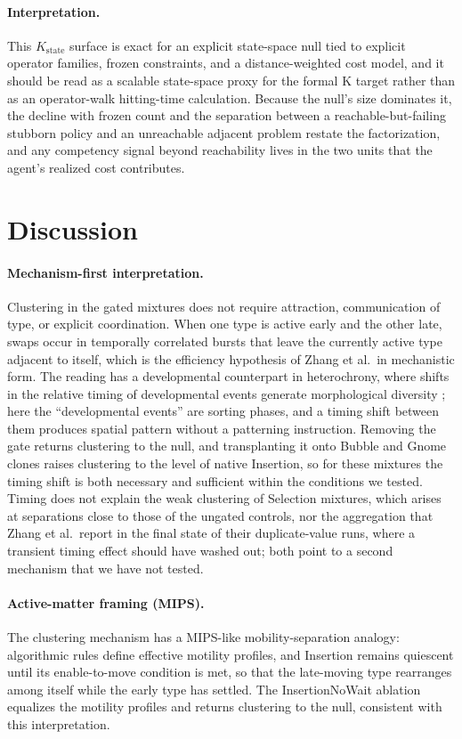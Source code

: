 \documentclass[11pt]{article}
\begin{document}
\paragraph{Interpretation.}
This $K_{\mathrm{state}}$ surface is exact for an explicit state-space null tied to explicit
operator families, frozen constraints, and a distance-weighted cost model, and it should be read as
a scalable state-space proxy for the formal K target rather than as an operator-walk hitting-time
calculation. Because the null's size dominates it, the decline with frozen count and the
separation between a reachable-but-failing stubborn policy and an unreachable adjacent problem
restate the factorization, and any competency signal beyond reachability lives in the two units
that the agent's realized cost contributes.

\section{Discussion}
\label{sec:discussion}
\paragraph{Mechanism-first interpretation.}
Clustering in the gated mixtures does not require attraction, communication of type, or explicit
coordination. When one type is active early and the other late, swaps occur in temporally
correlated bursts that leave the currently active type adjacent to itself, which is the efficiency
hypothesis of Zhang et al.\ in mechanistic form. The reading has a developmental counterpart in
heterochrony, where shifts in the relative timing of developmental events generate morphological
diversity \cite{gould1977ontogeny}; here the ``developmental events'' are sorting phases, and a
timing shift between them produces spatial pattern without a patterning instruction. Removing the
gate returns clustering to the null, and transplanting it onto Bubble and Gnome clones raises
clustering to the level of native Insertion, so for these mixtures the timing shift is both
necessary and sufficient within the conditions we tested. Timing does not explain the weak
clustering of Selection mixtures, which arises at separations close to those of the ungated
controls, nor the aggregation that Zhang et al.\ report in the final state of their
duplicate-value runs, where a transient timing effect should have washed out; both point to a
second mechanism that we have not tested.

\paragraph{Active-matter framing (MIPS).}
The clustering mechanism has a MIPS-like mobility-separation analogy: algorithmic rules define
effective motility profiles, and Insertion remains quiescent until its enable-to-move condition is
met, so that the late-moving type rearranges among itself while the early type has settled. The
InsertionNoWait ablation equalizes the motility profiles and returns clustering to the null,
consistent with this interpretation.
\end{document}
